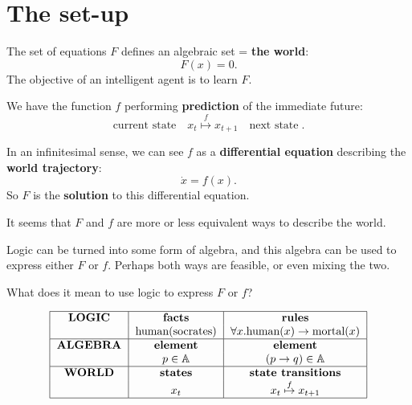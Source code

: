 \section{The set-up}

The set of equations $F$ defines an algebraic set = \textbf{the world}:
\begin{equation}
F(x) = 0 .
\end{equation}
The objective of an intelligent agent is to learn $F$.

We have the function $f$ performing \textbf{prediction} of the immediate future:
\begin{equation}
\boxed{\mbox{current state}} \quad x_t \stackrel{f}{\mapsto} x_{t+1} \quad \boxed{\mbox{next state}} \;.
\end{equation}

In an infinitesimal sense, we can see $f$ as a \textbf{differential equation} describing the \textbf{world trajectory}:
\begin{equation}
\dot{x} = f(x) .
\end{equation}
So $F$ is the \textbf{solution} to this differential equation.

It seems that $F$ and $f$ are more or less equivalent ways to describe the world.

Logic can be turned into some form of algebra, and this algebra can be used to express either $F$ or $f$.  Perhaps both ways are feasible, or even mixing the two.

What does it mean to use logic to express $F$ or $f$?

\begin{equation}
\begin{tabular}{|c|c|c|}
	\hline
	\textbf{LOGIC} & \textbf{facts} & \textbf{rules} \\
		& \mbox{human(socrates)} & $\forall x. \mbox{human}(x) \rightarrow \mbox{mortal}(x)$ \\
	\hline
	\textbf{ALGEBRA} & \textbf{element} & \textbf{element} \\
		& $p \in \mathbb{A} $ & $(p \rightarrow q) \in \mathbb{A} $ \\
	\hline
	\textbf{WORLD} & \textbf{states} & \textbf{state transitions} \\
		& $x_t$ & $x_t \stackrel{f}{\mapsto} x_{t+1}$ \\
	\hline
\end{tabular}
\end{equation}
